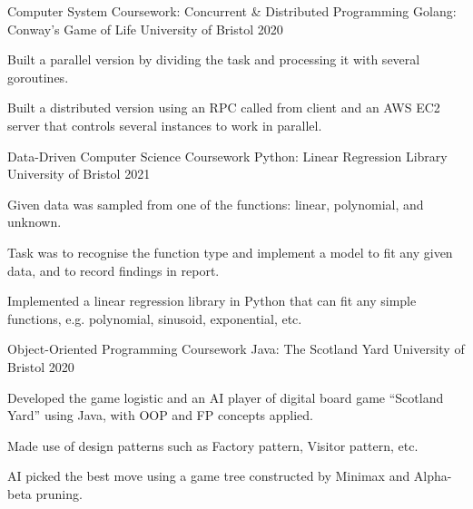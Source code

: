 

\begin{cventries}

  \cventry
    {Computer System Coursework: Concurrent \& Distributed Programming} %
    {Golang: Conway's Game of Life} %
    {University of Bristol} %
    {2020} %
    {
      \begin{cvitems} %
        \item {Built a parallel version by dividing the task and processing it with several goroutines.}
        \item {Built a distributed version using an RPC called from client and an AWS EC2 server that controls several instances to work in parallel.}
      \end{cvitems}
    }

  \cventry
    {Data-Driven Computer Science Coursework} %
    {Python: Linear Regression Library} %
    {University of Bristol} %
    {2021} %
    {
      \begin{cvitems} %
        \item {Given data was sampled from one of the functions: linear, polynomial, and unknown.}
        \item {Task was to recognise the function type and implement a model to fit any given data, and to record findings in report.}
        \item {Implemented a linear regression library in Python that can fit any simple functions, e.g. polynomial, sinusoid, exponential, etc.}
      \end{cvitems}
    }

  \cventry
    {Object-Oriented Programming Coursework} %
    {Java: The Scotland Yard} %
    {University of Bristol} %
    {2020} %
    {
      \begin{cvitems} %
        \item {Developed the game logistic and an AI player of digital board game “Scotland Yard” using Java, with OOP and FP concepts applied.}
        \item {Made use of design patterns such as Factory pattern, Visitor pattern, etc.}
        \item {AI picked the best move using a game tree constructed by Minimax and Alpha-beta pruning.}
      \end{cvitems}
    }


\end{cventries}
